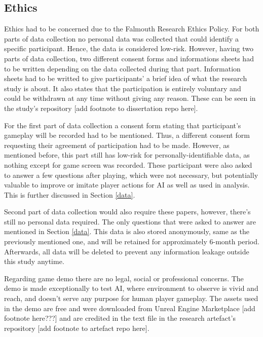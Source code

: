 \documentclass[journal]{IEEEtran}
\begin{document}
\subsection{Ethics}
Ethics had to be concerned due to the Falmouth Research Ethics Policy. For both parts of data collection no personal data was collected that could identify a specific participant. Hence, the data is considered low-risk. However, having two parts of data collection, two different consent forms and informations sheets had to be written depending on the data collected during that part. Information sheets had to be writted to give participants' a brief idea of what the research study is about. It also states that the participation is entirely voluntary and could be withdrawn at any time without giving any reason. These can be seen in the study's repository [add footnote to dissertation repo here].

For the first part of data collection a consent form stating that participant's gameplay will be recorded had to be mentioned. Thus, a different consent form requesting their agreement of participation had to be made. However, as mentioned before, this part still has low-risk for personally-identifiable data, as nothing except for game screen was recorded. These participant were also asked to answer a few questions after playing, which were not necessary, but potentially valuable to improve or imitate player actions for AI as well as used in analysis. This is further discussed in Section \ref{data}.

Second part of data collection would also require these papers, however, there's still no personal data required. The only questions that were asked to answer are mentioned in Section \ref{data}. This data is also stored anonymously, same as the previously mentioned one, and will be retained for approximately 6-month period. Afterwards, all data will be deleted to prevent any information leakage outside this study anytime.

Regarding game demo there are no legal, social or professional concerns. The demo is made exceptionally to test AI, where environment to observe is vivid and reach, and doesn't serve any purpose for human player gameplay. The assets used in the demo are free and were downloaded from Unreal Engine Marketplace [add footnote here???] and are credited in the text file in the research artefact's repository [add footnote to artefact repo here].

\end{document}
